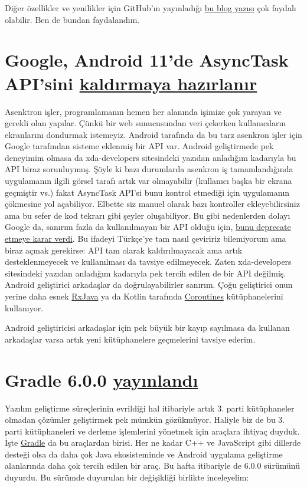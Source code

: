 \documentclass[11pt]{article}
\begin{document}
Diğer özellikler ve yenilikler için GitHub'ın yayınladığı \href{https://github.blog/2019-11-03-highlights-from-git-2-24/}{bu blog yazısı} çok
faydalı olabilir. Ben de bundan faydalandım.
\section{Google, Android 11'de AsyncTask API'sini \href{https://www.xda-developers.com/asynctask-deprecate-android-11/}{kaldırmaya hazırlanır}}
\label{sec:orgce2aec2}
Asenktron işler, programlamanın hemen her alanında işimize çok yarayan ve
gerekli olan yapılar. Çünkü bir web sunucusundan veri çekerken kullanıcıların
ekranlarını dondurmak istemeyiz. Android tarafında da bu tarz asenkron işler
için Google tarafından sisteme eklenmiş bir API var. Android geliştirmede pek
deneyimim olmasa da xda-developers sitesindeki yazıdan anladığım kadarıyla bu
API biraz sorunluymuş. Şöyle ki bazı durumlarda asenkron iş tamamlandığında
uygulamanın ilgili görsel tarafı artık var olmayabilir (kullanıcı başka bir
ekrana geçmiştir vs.) fakat AsyncTask API'si bunu kontrol etmediği için
uygulamanın çökmesine yol açabiliyor. Elbette siz manuel olarak bazı kontroller
ekleyebilirsiniz ama bu sefer de kod tekrarı gibi şeyler oluşabiliyor. Bu gibi
nedenlerden dolayı Google da, sanırım fazla da kullanılmayan bir API olduğu
için, \href{https://android-review.googlesource.com/c/platform/frameworks/base/+/1156409}{bunu deprecate etmeye karar verdi}. Bu ifadeyi Türkçe'ye tam nasıl
çeviririz bilemiyorum ama biraz açmak gerekirse: API tam olarak kaldırılmayacak
ama artık desteklenmeyecek ve kullanılması da tavsiye edilmeyecek. Zaten
xda-developers sitesindeki yazıdan anladığım kadarıyla pek tercih edilen de bir
API değilmiş. Android geliştirici arkadaşlar da doğrulayabilirler sanırım. Çoğu
geliştirici onun yerine daha esnek \href{https://github.com/ReactiveX/RxJava}{RxJava} ya da Kotlin tarafında \href{https://kotlinlang.org/docs/reference/coroutines-overview.html}{Coroutines}
kütüphanelerini kullanıyor.

Android geliştiricisi arkadaşlar için pek büyük bir kayıp sayılmasa da
kullanan arkadaşlar varsa artık yeni kütüphanelere geçmelerini tavsiye ederim.
\section{Gradle 6.0.0 \href{https://docs.gradle.org/6.0/release-notes.html}{yayınlandı}}
\label{sec:org947f2ea}
Yazılım geliştirme süreçlerinin evrildiği hal itibariyle artık 3. parti
kütüphaneler olmadan çözümler geliştirmek pek mümkün gözükmüyor. Haliyle biz
de bu 3. parti kütüphaneleri ve derleme işlemlerini yönetmek için araçlara
ihtiyaç duyduk. İşte \href{https://gradle.org/}{Gradle} da bu araçlardan birisi. Her ne kadar C++ ve
JavaScript gibi dillerde desteği olsa da daha çok Java ekosisteminde ve
Android uygulama geliştirme alanlarında daha çok tercih edilen bir araç. Bu
hafta itibariyle de 6.0.0 sürümünü duyurdu. Bu sürümde duyurulan bir
değişikliği birlikte inceleyelim:
\end{document}
